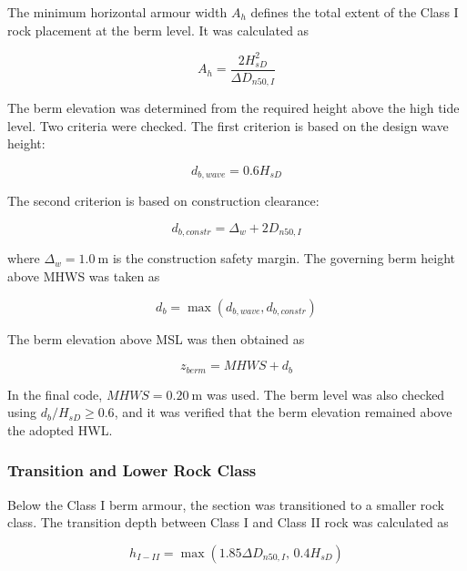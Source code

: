 \documentclass[a4paper, 11pt]{article}
\begin{document}
\hspace*{0.5cm} The minimum horizontal armour width \(A_h\) defines the total extent of the Class I rock placement at the berm level. It was calculated as

\begin{equation}
    A_h=\frac{2H_{sD}^{2}}{\Delta D_{n50,I}}
    \label{eq:berm_Ah}
\end{equation}

The berm elevation was determined from the required height above the high tide level. Two criteria were checked. The first criterion is based on the design wave height:

\begin{equation}
    d_{b,wave}=0.6H_{sD}
    \label{eq:berm_db_wave}
\end{equation}

The second criterion is based on construction clearance:

\begin{equation}
    d_{b,constr}=\Delta_w+2D_{n50,I}
    \label{eq:berm_db_constr}
\end{equation}

where \(\Delta_w=1.0~\mathrm{m}\) is the construction safety margin. The governing berm height above MHWS was taken as

\begin{equation}
    d_b=\max(d_{b,wave},d_{b,constr})
    \label{eq:berm_db}
\end{equation}

The berm elevation above MSL was then obtained as

\begin{equation}
    z_{berm}=MHWS+d_b
    \label{eq:berm_elev}
\end{equation}

In the final code, \(MHWS=0.20~\mathrm{m}\) was used. The berm level was also checked using \(d_b/H_{sD}\geq0.6\), and it was verified that the berm elevation remained above the adopted HWL.

\subsubsection{Transition and Lower Rock Class}

\hspace*{0.5cm} Below the Class I berm armour, the section was transitioned to a smaller rock class. The transition depth between Class I and Class II rock was calculated as

\begin{equation}
    h_{I-II}=
    \max(1.85\Delta D_{n50,I},\,0.4H_{sD})
    \label{eq:berm_transition}
\end{equation}
\end{document}

